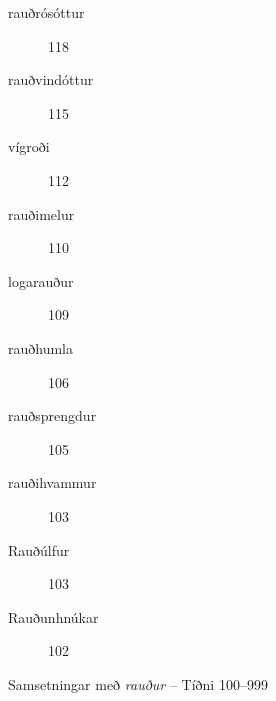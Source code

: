 \documentclass[../samsetningasafn.tex]{subfiles}
\begin{document}
\begin{bigwordlist}
\begin{footnotesize}
\begin{multicols}{4}
\begin{description}
		\item [rauðrósóttur]		118
		\item [rauðvindóttur]		115
		\item [vígroði]		112
		\item [rauðimelur]	110
		\item [logarauður]	109
		\item [rauðhumla]	106
		\item [rauðsprengdur]	105
		\item [rauðihvammur]		103
		\item [Rauðúlfur]		103
		\item [Rauðunhnúkar]		102
	\end{description}
\end{multicols}
\end{footnotesize}

\label{listi:svart999}
\caption{Samsetningar með \textit{rauður} -- Tíðni 100--999}
\end{bigwordlist}

\end{document}
